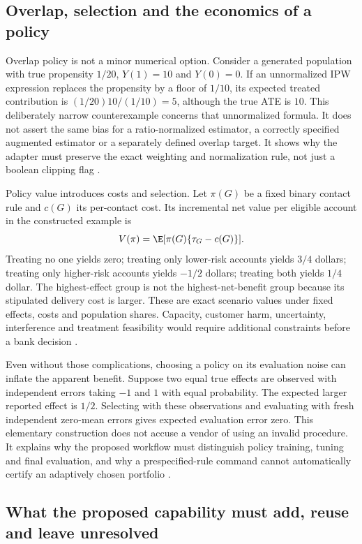 \subsection{Overlap, selection and the economics of a policy}

Overlap policy is not a minor numerical option. Consider a generated
population with true propensity $1/20$, $Y(1)=10$ and $Y(0)=0$. If an
unnormalized IPW expression replaces the propensity by a floor of $1/10$,
its expected treated contribution is $(1/20)10/(1/10)=5$, although the
true ATE is $10$. This deliberately narrow counterexample concerns that
unnormalized formula. It does not assert the same bias for a ratio-normalized
estimator, a correctly specified augmented estimator or a separately
defined overlap target. It shows why the adapter must preserve the exact
weighting and normalization rule, not just a boolean clipping flag
\cite{exec13_ch_exact}.

Policy value introduces costs and selection. Let $\pi(G)$ be a fixed
binary contact rule and $c(G)$ its per-contact cost. Its incremental net
value per eligible account in the constructed example is
\[
 V(\pi)=\E[\pi(G)\{\tau_G-c(G)\}].
\]
Treating no one yields zero; treating only lower-risk accounts yields
$3/4$ dollars; treating only higher-risk accounts yields $-1/2$ dollars;
treating both yields $1/4$ dollar. The highest-effect group is not the
highest-net-benefit group because its stipulated delivery cost is larger.
These are exact scenario values under fixed effects, costs and population
shares. Capacity, customer harm, uncertainty, interference and treatment
feasibility would require additional constraints before a bank decision
\cite{exec13_ch_exact}.

Even without those complications, choosing a policy on its evaluation
noise can inflate the apparent benefit. Suppose two equal true effects
are observed with independent errors taking $-1$ and $1$ with equal
probability. The expected larger reported effect is $1/2$. Selecting
with these observations and evaluating with fresh independent zero-mean
errors gives expected evaluation error zero. This elementary construction
does not accuse a vendor of using an invalid procedure. It explains why
the proposed workflow must distinguish policy training, tuning and final
evaluation, and why a prespecified-rule command cannot automatically
certify an adaptively chosen portfolio \cite{exec13_ch_exact}.

\subsection{What the proposed capability must add, reuse and leave unresolved}

